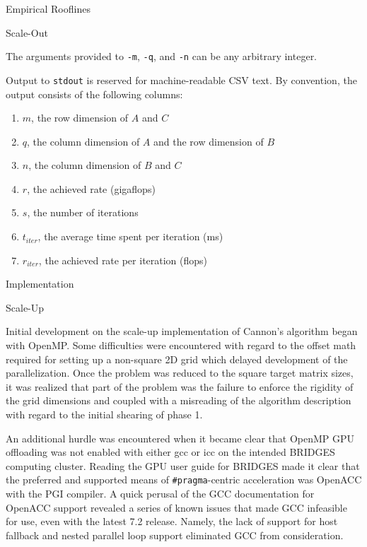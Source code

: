 \documentclass{article}
\begin{document}
\begin{section}{Empirical Rooflines}
\begin{subsection}{Scale-Out}
    \begin{paragraph}{}
      The arguments provided to \texttt{-m}, \texttt{-q}, and \texttt{-n} can be any arbitrary integer.
    \end{paragraph}
    \begin{paragraph}{}
      Output to \texttt{stdout} is reserved for machine-readable CSV text. By convention, the output consists of the following columns:
      \begin{enumerate}
      \item{$m$, the row dimension of $A$ and $C$}
      \item{$q$, the column dimension of $A$ and the row dimension of $B$}
      \item{$n$, the column dimension of $B$ and $C$}
      \item{$r$, the achieved rate (gigaflops)}
      \item{$s$, the number of iterations}
      \item{$t_{iter}$, the average time spent per iteration (ms)}
      \item{$r_{iter}$, the achieved rate per iteration (flops)}
      \end{enumerate}
    \end{paragraph}
  \end{subsection}
\end{section}

\begin{section}{Implementation}
  \begin{subsection}{Scale-Up}
    \begin{paragraph}{}
      Initial development on the scale-up implementation of Cannon's algorithm began with OpenMP. Some difficulties were encountered with regard
      to the offset math required for setting up a non-square 2D grid which delayed development of the parallelization. Once the problem was
      reduced to the square target matrix sizes, it was realized that part of the problem was the failure to enforce the rigidity of the grid dimensions
      and coupled with a misreading of the algorithm description with regard to the initial shearing of phase 1.
    \end{paragraph}
    \begin{paragraph}{}
      An additional hurdle was encountered when it became clear that OpenMP GPU offloading was not enabled with either gcc or icc on the intended
      BRIDGES computing cluster. Reading the GPU user guide for BRIDGES\autocite{BridgesGPUGuide} made it clear that the preferred and supported means of \texttt{\#pragma}-centric
      acceleration was OpenACC with the PGI compiler. A quick perusal of the GCC documentation for OpenACC support\autocite{gccOpenACC} revealed a series
      of known issues that made GCC infeasible for use, even with the latest 7.2 release. Namely, the lack of support for host fallback and nested
      parallel loop support eliminated GCC from consideration.
    \end{paragraph}
  \end{subsection}
\end{section}
\printbibliography
\end{document}
